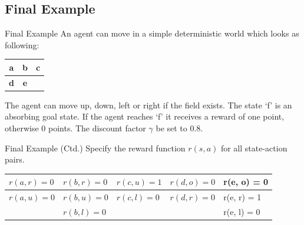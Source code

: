 \subsection{Final Example}

\begin{frame}{Final Example}{}
	An agent can move in a simple deterministic world which looks as following:

	\begin{table}
		\centering
		\begin{tabular}{| c | c | c |}
			\hline
			\textbf{a} & \textbf{b} & \textbf{c} 		\\ \hline
			\textbf{d} & \textbf{e} & \highlight{f}		\\ \hline
		\end{tabular}
	\end{table}

	The agent can move up, down, left or right if the field exists. The state `f' is an absorbing goal state. If the agent reaches `f'
	it receives a reward of one point, otherwise 0 points. The discount factor $\gamma$ be set to 0.8.
\end{frame}


\begin{frame}{Final Example (Ctd.)}{}
	 Specify the reward function $r(s, a)$ for all state-action pairs.
	
	\begin{table}
		\centering
		\begin{tabular}{| l | l | l | l | l |}
			\hline
			$r(a, r) = 0$ 	& 	$r(b, r) = 0$ 	& 	$r(c, u) = 1$ 	& $r(d, o) = 0$ 		& r(e, o) = 0		\\ \hline
			$r(a, u) = 0$ 	& 	$r(b, u) = 0$ 	& 	$r(c, l) = 0$ 	& $r(d, r) = 0$ 		& r(e, r) = 1		\\ \hline
			 			& 	$r(b, l) = 0$ 	&  				& 				& r(e, l) = 0		\\ \hline
		\end{tabular}
	\end{table}
\end{frame}


